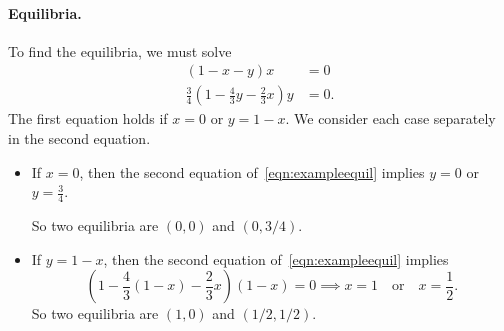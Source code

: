 \documentclass[reqno]{immbook}
\begin{document}
\paragraph{Equilibria.}
To find the equilibria, we must solve
\begin{equation}
\begin{split}
(1-x-y)x & = 0 \\
\frac{3}{4}\left(1 -\frac{4}{3}y - \frac{2}{3}x\right)y & = 0.
\end{split}
\label{eqn:exampleequil}
\end{equation}
The first equation holds if $x=0$ or $y = 1-x$.
We consider each case separately in the second equation.
\begin{itemize}
\item
If $x=0$, then the second equation of~\eqref{eqn:exampleequil} implies
$y=0$ or $y=\frac{3}{4}$.

So two equilibria are $(0,0)$ and $(0,3/4)$.
\item
If $y=1-x$, then the second equation
of~\eqref{eqn:exampleequil} implies
\begin{equation}
  \left(1-\frac{4}{3}(1-x) - \frac{2}{3}x\right)(1-x) = 0
  \implies x=1 \quad \textrm{or} \quad x=\frac{1}{2}.
\end{equation}
So two equilibria are $(1,0)$ and $(1/2,1/2)$.
\end{itemize}
\end{document}
